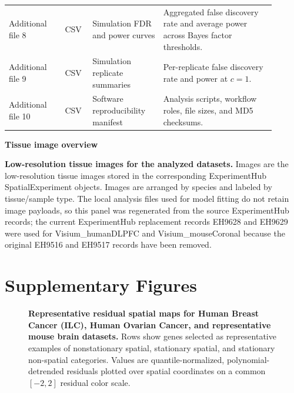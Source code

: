 \begin{table}[htbp]
\begin{tabular}{p{0.19\linewidth}p{0.09\linewidth}p{0.24\linewidth}p{0.38\linewidth}}
Additional file 8 & CSV & Simulation FDR and power curves & Aggregated false discovery rate and average power across Bayes factor thresholds.\\
Additional file 9 & CSV & Simulation replicate summaries & Per-replicate false discovery rate and power at \(c=1\).\\
Additional file 10 & CSV & Software reproducibility manifest & Analysis scripts, workflow roles, file sizes, and MD5 checksums.\\
\bottomrule
\end{tabular}
\end{table}

\begin{landscape}
\begin{center}
\textbf{Tissue image overview}\\[4pt]

\small
\textbf{Low-resolution tissue images for the analyzed datasets.} Images are the low-resolution tissue images stored in the corresponding ExperimentHub SpatialExperiment objects. Images are arranged by species and labeled by tissue/sample type. The local analysis files used for model fitting do not retain image payloads, so this panel was regenerated from the source ExperimentHub records; the current ExperimentHub replacement records EH9628 and EH9629 were used for Visium\_humanDLPFC and Visium\_mouseCoronal because the original EH9516 and EH9517 records have been removed.
\end{center}
\end{landscape}

\clearpage
\section{Supplementary Figures}

\begin{landscape}
\begin{figure}[H]
\centering
{}
\caption{\textbf{Representative residual spatial maps for Human Breast Cancer (ILC), Human Ovarian Cancer, and representative mouse brain datasets.} Rows show genes selected as representative examples of nonstationary spatial, stationary spatial, and stationary non-spatial categories. Values are quantile-normalized, polynomial-detrended residuals plotted over spatial coordinates on a common \([-2,2]\) residual color scale.}
\label{fig:s1}
\end{figure}
\end{landscape}

